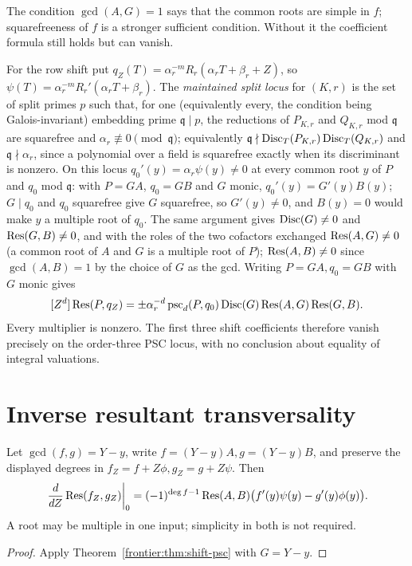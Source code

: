 The condition $\gcd(A,G)=1$ says that the common roots are simple in $f$;
squarefreeness of $f$ is a stronger sufficient condition. Without it the
coefficient formula still holds but can vanish.

For the row shift put
$q_Z(T)=\alpha_r^{-m}R_r(\alpha_rT+\beta_r+Z)$, so
$\psi(T)=\alpha_r^{-m}R_r'(\alpha_rT+\beta_r)$.
The \emph{maintained split locus} for $(K,r)$ is the set of split primes $p$
such that, for one (equivalently every, the condition being Galois-invariant)
embedding prime $\mathfrak q\mid p$, the reductions of $P_{K,r}$ and $Q_{K,r}$
mod $\mathfrak q$ are squarefree and $\alpha_r\not\equiv0\pmod{\mathfrak q}$;
equivalently $\mathfrak q\nmid\operatorname{Disc}_T(P_{K,r})\operatorname{Disc}_T(Q_{K,r})$ and
$\mathfrak q\nmid\alpha_r$, since a polynomial over a field is squarefree
exactly when its discriminant is nonzero.
On this locus $q_0'(y)=\alpha_r\psi(y)\ne0$ at every common root $y$ of $P$
and $q_0$ mod $\mathfrak q$: with $P=GA$, $q_0=GB$ and $G$ monic,
$q_0'(y)=G'(y)B(y)$; $G\mid q_0$ and $q_0$ squarefree give $G$ squarefree,
so $G'(y)\ne0$, and $B(y)=0$ would make $y$ a multiple root of $q_0$.
The same argument gives $\operatorname{Disc}(G)\ne0$ and $\operatorname{Res}(G,B)\ne0$, and with the
roles of the two cofactors exchanged $\operatorname{Res}(A,G)\ne0$ (a common root of $A$
and $G$ is a multiple root of $P$); $\operatorname{Res}(A,B)\ne0$ since $\gcd(A,B)=1$
by the choice of $G$ as the gcd. Writing $P=GA,q_0=GB$ with $G$ monic gives
\begin{equation}\label{frontier:eq:explicit-local}
[Z^d]\operatorname{Res}(P,q_Z)
 =\pm\alpha_r^{-d}\operatorname{psc}_d(P,q_0)
 \operatorname{Disc}(G)\operatorname{Res}(A,G)\operatorname{Res}(G,B).
\end{equation}
Every multiplier is nonzero. The first three shift coefficients therefore
vanish precisely on the order-three PSC locus, with no conclusion about
equality of integral valuations.

\section{Inverse resultant transversality}
\begin{theorem}\label{frontier:thm:derivative}
Let $\gcd(f,g)=Y-y$, write $f=(Y-y)A,g=(Y-y)B$, and preserve the displayed
degrees in $f_Z=f+Z\phi,g_Z=g+Z\psi$. Then
\[
\left.\frac{d}{dZ}\operatorname{Res}(f_Z,g_Z)\right|_0
=(-1)^{\deg f-1}\operatorname{Res}(A,B)
       \bigl(f'(y)\psi(y)-g'(y)\phi(y)\bigr).
\]
A root may be multiple in one input; simplicity in both is not required.
\end{theorem}
\begin{proof}
Apply Theorem~\ref{frontier:thm:shift-psc} with $G=Y-y$.
\end{proof}

